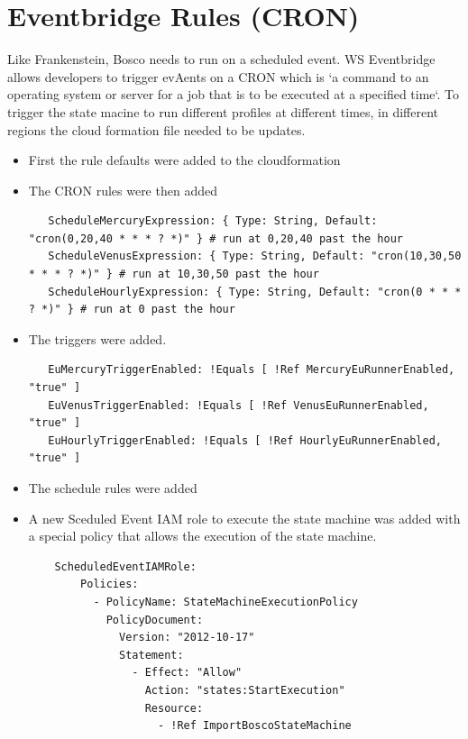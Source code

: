 \documentclass[12pt,a4paper,titlepage]{report}
\begin{document}
\section{Eventbridge Rules (CRON) }

Like Frankenstein, Bosco needs to run on a scheduled event. WS Eventbridge allows developers to trigger evAents on a CRON which is `a command to an operating system or server for a job that is to be executed at a specified time`. 
To trigger the state macine to run different profiles at different times, in different regions the cloud formation file needed to be updates. 
\begin{itemize}
 \item First the rule defaults were added to the cloudformation
 \item The CRON rules were then added 
  \begin{tcolorbox}
   \begin{verbatim}
   ScheduleMercuryExpression: { Type: String, Default: "cron(0,20,40 * * * ? *)" } # run at 0,20,40 past the hour
   ScheduleVenusExpression: { Type: String, Default: "cron(10,30,50 * * * ? *)" } # run at 10,30,50 past the hour
   ScheduleHourlyExpression: { Type: String, Default: "cron(0 * * * ? *)" } # run at 0 past the hour
   \end{verbatim}
  \end{tcolorbox}

 \item The triggers were added.
 \begin{tcolorbox}
  \begin{verbatim}
   EuMercuryTriggerEnabled: !Equals [ !Ref MercuryEuRunnerEnabled, "true" ]
   EuVenusTriggerEnabled: !Equals [ !Ref VenusEuRunnerEnabled, "true" ]
   EuHourlyTriggerEnabled: !Equals [ !Ref HourlyEuRunnerEnabled, "true" ]
  \end{verbatim}
 \end{tcolorbox}
 \item The schedule rules were added
 \item A new Sceduled Event IAM role to execute the state machine was added with a special policy that allows the execution of the state machine. 
 
 \begin{tcolorbox}
  \begin{verbatim}
    ScheduledEventIAMRole:
        Policies:
          - PolicyName: StateMachineExecutionPolicy
            PolicyDocument:
              Version: "2012-10-17"
              Statement:
                - Effect: "Allow"
                  Action: "states:StartExecution"
                  Resource:
                    - !Ref ImportBoscoStateMachine
  \end{verbatim}
 \end{tcolorbox}
\end{itemize}
\end{document}
